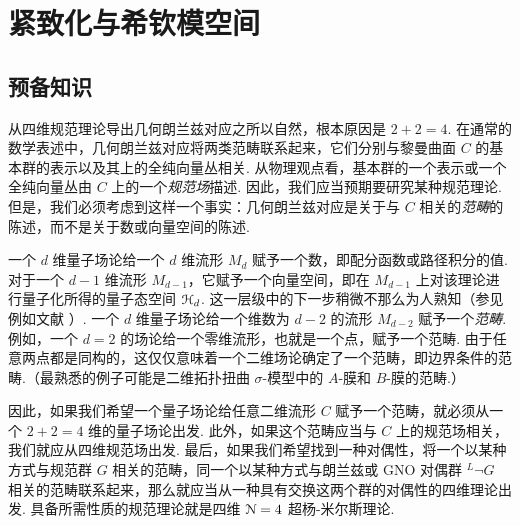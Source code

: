 \section{紧致化与希钦模空间}
\label{compacthitchin}

\subsection{预备知识}\label{prelims}

从四维规范理论导出几何朗兰兹对应之所以自然，根本原因是 $2+2=4$. 在通常的数学表述中，几何朗兰兹对应将两类范畴联系起来，它们分别与黎曼曲面 $C$ 的基本群的表示以及其上的全纯向量丛相关. 从物理观点看，基本群的一个表示或一个全纯向量丛由 $C$ 上的一个{\it 规范场}描述. 因此，我们应当预期要研究某种规范理论. 但是，我们必须考虑到这样一个事实：几何朗兰兹对应是关于与 $C$ 相关的{\it 范畴}的陈述，而不是关于数或向量空间的陈述.

一个 $d$ 维量子场论给一个 $d$ 维流形 $M_d$ 赋予一个数，即配分函数或路径积分的值. 对于一个 $d-1$ 维流形 $M_{d-1}$，它赋予一个向量空间，即在 $M_{d-1}$ 上对该理论进行量子化所得的量子态空间 ${\mathcal H}_d$. 这一层级中的下一步稍微不那么为人熟知（参见例如文献 \cite{Freed,BD,
Kapustin}）. 一个 $d$ 维量子场论给一个维数为 $d-2$ 的流形 $M_{d-2}$ 赋予一个{\it 范畴}. 例如，一个 $d=2$ 的场论给一个零维流形，也就是一个点，赋予一个范畴. 由于任意两点都是同构的，这仅仅意味着一个二维场论确定了一个范畴，即边界条件的范畴.（最熟悉的例子可能是二维拓扑扭曲 $\sigma$-模型中的 $A$-膜和 $B$-膜的范畴.）

因此，如果我们希望一个量子场论给任意二维流形 $C$ 赋予一个范畴，就必须从一个 $2+2=4$ 维的量子场论出发. 此外，如果这个范畴应当与 $C$ 上的规范场相关，我们就应从四维规范场出发. 最后，如果我们希望找到一种对偶性，将一个以某种方式与规范群 $G$ 相关的范畴，同一个以某种方式与朗兰兹或 GNO 对偶群 $^L\neg G$ 相关的范畴联系起来，那么就应当从一种具有交换这两个群的对偶性的四维理论出发. 具备所需性质的规范理论就是四维 ${\cal N}=4$ 超杨-米尔斯理论.

